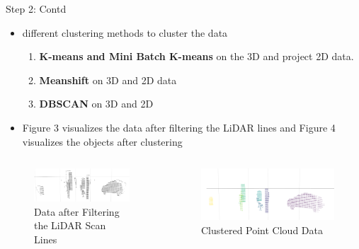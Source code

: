 \documentclass[9pt]{beamer}
\begin{document}
\begin{frame}[fragile]{Step 2: Contd}
	\begin{itemize}
		\item {} different clustering methods to cluster the data
		\begin{enumerate}
			\item \textbf{K-means and Mini Batch K-means} on the 3D and project 2D data.
			\item \textbf{Meanshift} on 3D and 2D data
			\item \textbf{DBSCAN} on 3D and 2D
		\end{enumerate}
		\item Figure 3 visualizes the data after filtering the LiDAR lines and Figure 4 visualizes the objects after clustering
	\end{itemize}

	\begin{columns}
		\begin{column}{0.48\textwidth}
			\begin{figure}
				\centering
				\includegraphics[width=\textwidth]{images/ground_after2.png}
				\caption{Data after Filtering the LiDAR Scan Lines}
			\end{figure}
		\end{column}
		\begin{column}{0.48\textwidth}
			\begin{figure}
				\centering
				\includegraphics[width=\textwidth]{images/seg_noise_removal.png}		
				\caption{Clustered Point Cloud Data}
			\end{figure}
		\end{column}
	\end{columns}

\end{frame}
\end{document}
